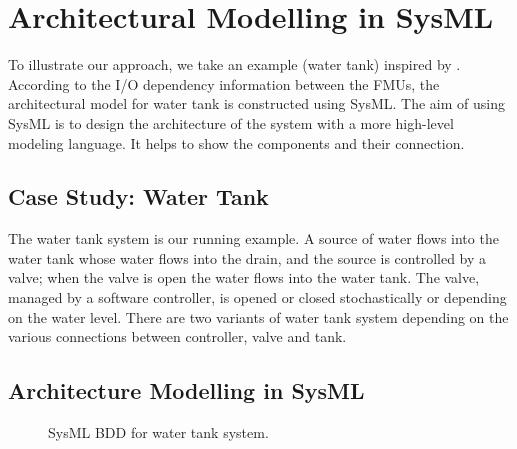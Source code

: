 
\section{Architectural Modelling in SysML}
\label{sec:sysml}
To illustrate our approach, we take an example (water tank) inspired by \cite{AmalioPCW16}. According to the I/O dependency information between the FMUs, the architectural model for water tank is constructed using SysML. The aim of using SysML is to design the architecture of the system with a more high-level modeling language. It helps to show the components and their connection.
\subsection{Case Study: Water Tank}

The water tank system is our running example. A source of water flows into the water tank whose water flows into the drain, and the source is controlled by a valve; when the valve is open the water flows into the water tank. The valve, managed by a software controller, is opened or closed stochastically or depending on the water level. There are two variants of water tank system depending on the various connections between controller, valve and tank. 

\subsection{Architecture Modelling in SysML}

\begin{figure}[htbp]
	\caption{SysML BDD for water tank system.}
	\label{myad}
\end{figure}


